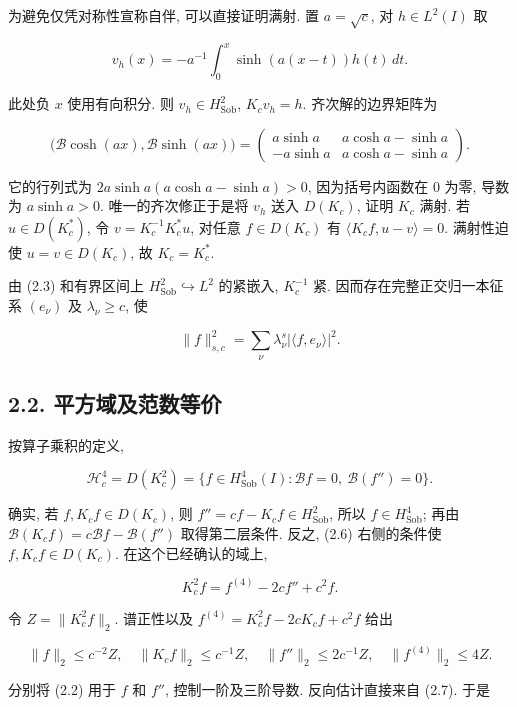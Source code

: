 \documentclass[UTF8,fontset=fandol,11pt,a4paper]{ctexart}
\begin{document}
为避免仅凭对称性宣称自伴, 可以直接证明满射. 置 \(a=\sqrt c\), 对 \(h\in L^2(I)\) 取


\[
 v_h(x)=-a^{-1}\int_0^x\sinh(a(x-t))h(t)\,dt.
\]


此处负 \(x\) 使用有向积分. 则 \(v_h\in H_{\mathrm{Sob}}^2\), \(K_cv_h=h\). 齐次解的边界矩阵为


\[
 \bigl(\mathcal B\cosh(ax),\mathcal B\sinh(ax)\bigr)=
 \begin{pmatrix}a\sinh a&a\cosh a-\sinh a\\
                 -a\sinh a&a\cosh a-\sinh a\end{pmatrix}.
 \tag{2.4}
\]


它的行列式为 \(2a\sinh a(a\cosh a-\sinh a)>0\), 因为括号内函数在 0 为零, 导数为 \(a\sinh a>0\). 唯一的齐次修正于是将 \(v_h\) 送入 \(D(K_c)\), 证明 \(K_c\) 满射. 若 \(u\in D(K_c^*)\), 令 \(v=K_c^{-1}K_c^*u\), 对任意 \(f\in D(K_c)\) 有
\(\langle K_cf,u-v\rangle=0\). 满射性迫使 \(u=v\in D(K_c)\), 故 \(K_c=K_c^*\).


由 (2.3) 和有界区间上 \(H_{\mathrm{Sob}}^2\hookrightarrow L^2\) 的紧嵌入, \(K_c^{-1}\) 紧. 因而存在完整正交归一本征系 \((e_\nu)\) 及 \(\lambda_\nu\ge c\), 使


\[
 \|f\|_{s,c}^2=\sum_\nu\lambda_\nu^s|\langle f,e_\nu\rangle|^2.
 \tag{2.5}
\]


\subsection*{2.2. 平方域及范数等价}

按算子乘积的定义,


\[
 \boxed{\mathcal H_c^4=D(K_c^2)
 =\{f\in H_{\mathrm{Sob}}^4(I):
       \mathcal Bf=0,\ \mathcal B(f'')=0\}.}
 \tag{2.6}
\]


确实, 若 \(f,K_cf\in D(K_c)\), 则 \(f''=cf-K_cf\in H_{\mathrm{Sob}}^2\), 所以 \(f\in H_{\mathrm{Sob}}^4\); 再由
\(\mathcal B(K_cf)=c\mathcal Bf-\mathcal B(f'')\)
取得第二层条件. 反之, (2.6) 右侧的条件使 \(f,K_cf\in D(K_c)\). 在这个已经确认的域上,


\[
 K_c^2f=f^{(4)}-2cf''+c^2f.
 \tag{2.7}
\]


令 \(Z=\|K_c^2f\|_2\). 谱正性以及
\(f^{(4)}=K_c^2f-2cK_cf+c^2f\) 给出


\[
 \|f\|_2\le c^{-2}Z,\quad
 \|K_cf\|_2\le c^{-1}Z,\quad
 \|f''\|_2\le2c^{-1}Z,\quad
 \|f^{(4)}\|_2\le4Z.
 \tag{2.8}
\]


分别将 (2.2) 用于 \(f\) 和 \(f''\), 控制一阶及三阶导数. 反向估计直接来自 (2.7). 于是
\end{document}
